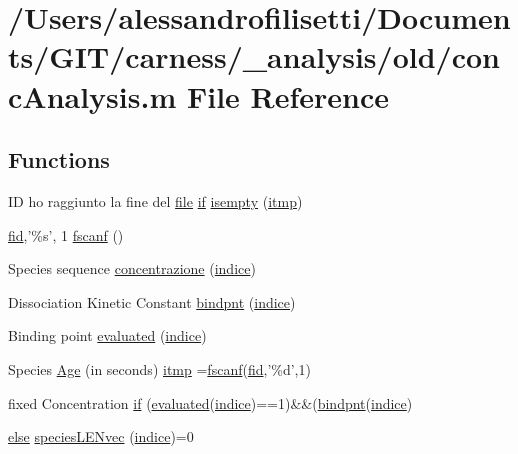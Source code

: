\hypertarget{a00025}{\section{/\-Users/alessandrofilisetti/\-Documents/\-G\-I\-T/carness/\-\_\-analysis/old/conc\-Analysis.m File Reference}
\label{a00025}
}
\subsection*{Functions}
\begin{DoxyCompactItemize}
\item 
I\-D ho raggiunto la fine del \hyperlink{a00110_a4e8353d6c62cf54bf4a1a8f63e56b8c3}{file} \hyperlink{a00030_a01d55766b8058903dd360b4bda71f9f5}{if} \hyperlink{a00025_ac10445404f4b83302522defb59e25ef7}{isempty} (\hyperlink{a00025_af17812863fb385a507b5b07ed6166569}{itmp})
\item 
\hyperlink{a00031_ae9011d40c6f13e68e6f07156e0da7c5d}{fid},'\%s', 1 \hyperlink{a00025_a028ac102a731e62fb0a7439381f566c1}{fscanf} ()
\item 
Species sequence \hyperlink{a00025_a816e2260bf1c36cbca7ade7517c19b07}{concentrazione} (\hyperlink{a00025_a776b2bbd08be028d44f6d4260f27633a}{indice})
\item 
Dissociation Kinetic Constant \hyperlink{a00025_abe7c50c8b184b4269ba5aaecedcd5457}{bindpnt} (\hyperlink{a00025_a776b2bbd08be028d44f6d4260f27633a}{indice})
\item 
Binding point \hyperlink{a00025_a5e1fe2a8074aede6ad4a7a0613f0f91c}{evaluated} (\hyperlink{a00025_a776b2bbd08be028d44f6d4260f27633a}{indice})
\item 
Species \hyperlink{a00025_aefba28007767b12696670c7309808dd1}{Age} (in seconds) \hyperlink{a00025_af17812863fb385a507b5b07ed6166569}{itmp} =\hyperlink{a00025_a028ac102a731e62fb0a7439381f566c1}{fscanf}(\hyperlink{a00031_ae9011d40c6f13e68e6f07156e0da7c5d}{fid},'\%d',1)
\item 
fixed Concentration \hyperlink{a00025_adf3394dfd4755fd0ef2854fe558ff8aa}{if} (\hyperlink{a00025_a5e1fe2a8074aede6ad4a7a0613f0f91c}{evaluated}(\hyperlink{a00025_a776b2bbd08be028d44f6d4260f27633a}{indice})==1)\&\&(\hyperlink{a00025_abe7c50c8b184b4269ba5aaecedcd5457}{bindpnt}(\hyperlink{a00025_a776b2bbd08be028d44f6d4260f27633a}{indice})
\item 
\hyperlink{a00031_af5946383720aa572eb93e1e63afc23c2}{else} \hyperlink{a00025_a63d65c48296edd79c9a2419e091206d0}{species\-L\-E\-Nvec} (\hyperlink{a00025_a776b2bbd08be028d44f6d4260f27633a}{indice})=0

\end{DoxyCompactItemize}
